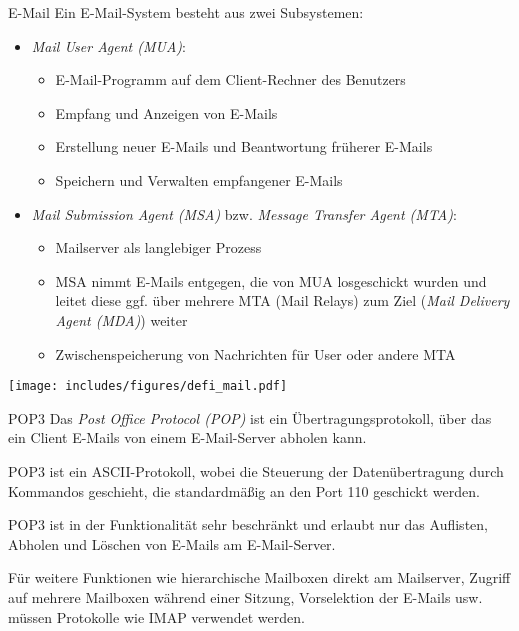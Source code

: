 \begin{defi}{E-Mail}
    Ein E-Mail-System besteht aus zwei Subsystemen:
    \begin{itemize}
        \item \emph{Mail User Agent (MUA)}:
              \begin{itemize}
                  \item E-Mail-Programm auf dem Client-Rechner des Benutzers
                  \item Empfang und Anzeigen von E-Mails
                  \item Erstellung neuer E-Mails und Beantwortung früherer E-Mails
                  \item Speichern und Verwalten empfangener E-Mails
              \end{itemize}
        \item \emph{Mail Submission Agent (MSA)} bzw. \emph{Message Transfer Agent (MTA)}:
              \begin{itemize}
                  \item Mailserver als langlebiger Prozess
                  \item MSA nimmt E-Mails entgegen, die von MUA losgeschickt wurden und leitet diese ggf. über mehrere MTA (Mail Relays) zum Ziel (\emph{Mail Delivery Agent (MDA)}) weiter
                  \item Zwischenspeicherung von Nachrichten für User oder andere MTA
              \end{itemize}
    \end{itemize}

    \centering
    \texttt{[image: includes/figures/defi\_mail.pdf]}
\end{defi}

\begin{bonus}{POP3}
    Das \emph{Post Office Protocol (POP)} ist ein Übertragungsprotokoll, über das ein Client E-Mails von einem E-Mail-Server abholen kann.

    POP3 ist ein ASCII-Protokoll, wobei die Steuerung der Datenübertragung durch Kommandos geschieht, die standardmäßig an den Port 110 geschickt werden.

    POP3 ist in der Funktionalität sehr beschränkt und erlaubt nur das Auflisten, Abholen und Löschen von E-Mails am E-Mail-Server.

    Für weitere Funktionen wie hierarchische Mailboxen direkt am Mailserver, Zugriff auf mehrere Mailboxen während einer Sitzung, Vorselektion der E-Mails usw. müssen Protokolle wie IMAP verwendet werden.
\end{bonus}

